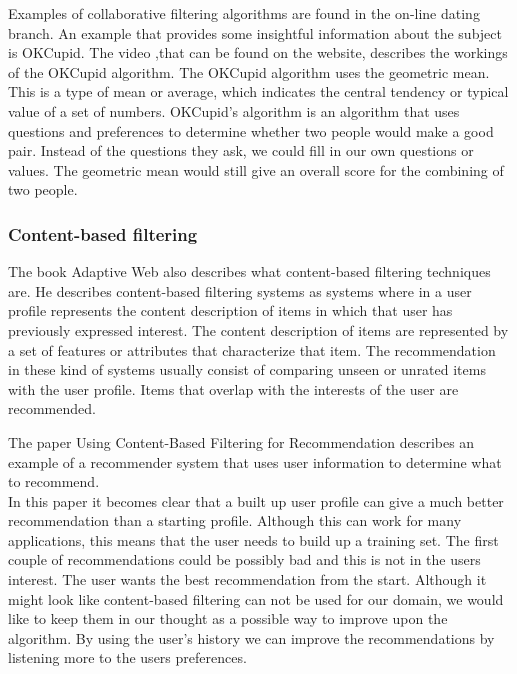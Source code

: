 Examples of collaborative filtering algorithms are found in the on-line dating branch.
An example that provides some insightful information about the subject is OKCupid.
The video ,that can be found on the website\cite{okcupid}, describes the workings of the OKCupid algorithm.
The OKCupid algorithm uses the geometric mean.
This is a type of mean or average, which indicates the central tendency or typical value of a set of numbers.
OKCupid's algorithm is an algorithm that uses questions and preferences to determine whether two people would make a good pair.
Instead of the questions they ask, we could fill in our own questions or values.
The geometric mean would still give an overall score for the combining of two people.

\subsubsection*{Content-based filtering}
The book Adaptive Web \citep{Peter2007} also describes what content-based filtering techniques are.
He describes content-based filtering systems as systems where in a user profile represents the content description of items in which that user has previously expressed interest.
The content description of items are represented by a set of features or attributes that characterize that item.
The recommendation in these kind of systems usually consist of comparing unseen or unrated items with the user profile.
Items that overlap with the interests of the user are recommended.

The paper Using Content-Based Filtering for Recommendation \cite{van2000using} describes an example of a recommender system that uses user information to determine what to recommend.\\
In this paper it becomes clear that a built up user profile can give a much better recommendation than a starting profile.
Although this can work for many applications, this means that the user needs to build up a training set.
The first couple of recommendations could be possibly bad and this is not in the users interest.
The user wants the best recommendation from the start.
Although it might look like content-based filtering can not be used for our domain, we would like to keep them in our thought as a possible way to improve upon the algorithm.
By using the user's history we can improve the recommendations by listening more to the users preferences.

